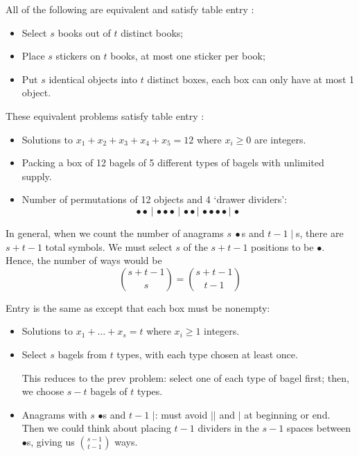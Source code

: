 \documentclass[12pt]{article}
\begin{document}
\eg All of the following are equivalent and satisfy table entry :
\begin{itemize}
    \item Select $s$ books out of $t$ distinct books;
    \item Place $s$ stickers on $t$ books, at most one sticker per book;
    \item Put $s$ identical objects into $t$ distinct boxes, each box can only have at most 1 object.
\end{itemize}

\eg These equivalent problems satisfy table entry :
\begin{itemize}
    \item Solutions to $x_1+x_2+x_3+x_4+x_5=12$ where $x_i\geq 0$ are integers.
    \item Packing a box of 12 bagels of 5 different types of bagels with unlimited supply.
    \item Number of permutations of 12 objects and 4 `drawer dividers': \[\bullet\bullet \,|\, \bullet\bullet\bullet \,|\, \bullet\bullet\,|\, \bullet\bullet\bullet\bullet \,|\, \bullet\]
\end{itemize}

\rmk In general, when we count the number of anagrams $s~\bullet$s and $t-1 \mid$s, there are $s+t-1$ total symbols. We must select $s$ of the $s+t-1$ positions to be $\bullet$. Hence, the number of ways would be \[{{s+t-1}\choose s}={{s+t-1}\choose t-1}\]

\eg Entry  is the same as  except that each box must be nonempty:\begin{itemize}
    \item Solutions to $x_1+\dots + x_s=t$ where $x_i\geq 1$ integers.
    \item Select $s$ bagels from $t$ types, with each type chosen at least once. 
    
    This reduces to the prev problem: select one of each type of bagel first; then, we choose $s-t$ bagels of $t$ types.

    \item Anagrams with $s$ $\bullet$s and $t-1$ $\mid$: must avoid $||$ and $|$ at beginning or end. Then we could think about placing $t-1$ dividers in the $s-1$ spaces between $\bullet$s, giving us $s-1\choose t-1$ ways.
\end{itemize}
\end{document}
